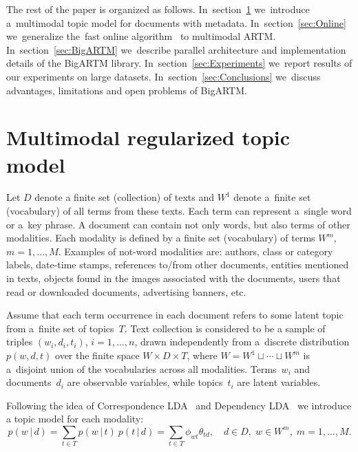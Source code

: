 \documentclass[russian,english]{llncs}
\newcommand{\cond}{\mspace{3mu}{|}\mspace{3mu}}
\begin{document}
The rest of the paper is organized as follows.
In~section~\ref{sec:Multimodal}
we~introduce a~multimodal topic model for documents with metadata.
In~section~\ref{sec:Online}
we~generalize the~fast online algorithm~\cite{hoffman10online} to multimodal ARTM.
In~section~\ref{sec:BigARTM}
we~describe parallel architecture and implementation details of the BigARTM library.
In~section~\ref{sec:Experiments}
we~report results of our experiments on large datasets.
In~section~\ref{sec:Conclusions}
we~discuss advantages, limitations and open problems of BigARTM.

\section{Multimodal regularized topic model}
\label{sec:Multimodal}


Let
$D$ denote a finite set (collection) of texts and
$W^1$ denote a~finite set (vocabulary) of all terms from these texts.
Each term can represent a~single word or a~key phrase.
A document can contain not only words, but also terms of other modalities.
Each modality is defined by a finite set (vocabulary) of terms $W^m$, ${m=1,\dots,M}$.
Examples of not-word modalities are:
authors,
class or category labels,
date-time stamps,
references to/from other documents,
entities mentioned in texts,
objects found in the images associated with the documents,
users that read or downloaded documents,
advertising banners,
etc.

Assume that
each term occurrence in each document refers to some latent topic from a~finite set of topics~$T$.
Text collection is considered to be a sample of triples
$(w_i,d_i,t_i)$,\; ${i=1,\dots,n}$,
drawn independently from a~discrete distribution $p(w,d,t)$ over the finite space $W\times D \times T$,
where ${W=W^1\sqcup\cdots\sqcup W^m}$ is a~disjoint union of the vocabularies across all modalities.
Terms~$w_i$ and documents~$d_i$ are observable variables,
while topics~$t_i$ are latent variables.

Following the idea of Correspondence LDA~\cite{blei03modeling}
and Dependency LDA~\cite{rubin12statistical}
we introduce a topic model for each modality:
\[
    p(w\cond d)
    = \sum_{t\in T} p(w\cond t)\: p(t\cond d)
    = \sum_{t\in T} \phi_{wt} \theta_{td},
    \quad
    d\in D,\; w\in W^m,\; m=1,\dots,M.
\]
\end{document}
